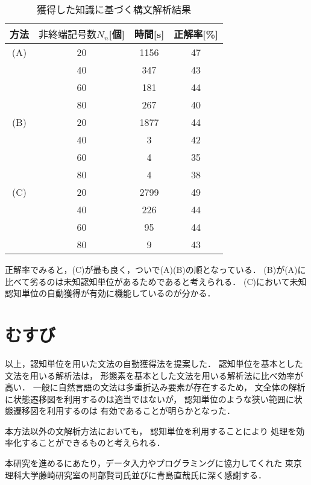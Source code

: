 \begin{table}
\caption{獲得した知識に基づく構文解析結果} \label{hyo4}
\begin{center}
\begin{tabular}{c|c|cc}
\hline \hline
方法 &$非終端記号数N_n$[個] & 時間[s] & 正解率[\%] \\ \hline \hline
(A) & 20 & 1156 & 47 \\
& 40 & 347 & 43 \\
& 60 & 181 & 44 \\
& 80 & 267 & 40 \\ \hline
(B) & 20 & 1877 & 44 \\
& 40 &3 & 42 \\ 
& 60 & 4 & 35 \\
& 80 & 4 & 38 \\ \hline
(C) & 20 & 2799 & 49 \\
& 40 & 226 & 44 \\
& 60 & 95 & 44 \\
& 80 & 9 & 43 \\
\hline \hline
\end{tabular}
\vspace*{-4mm}
\end{center}
\end{table}


正解率でみると，(C)が最も良く，ついで(A)(B)の順となっている．
(B)が(A)に比べて劣るのは未知認知単位があるためであると考えられる．
(C)において未知認知単位の自動獲得が有効に機能しているのが分かる．

\section{むすび}
以上，認知単位を用いた文法の自動獲得法を提案した．
認知単位を基本とした文法を用いる解析法は，
形態素を基本とした文法を用いる解析法に比べ効率が高い．
一般に自然言語の文法は多重折込み要素が存在するため，
文全体の解析に状態遷移図を利用するのは適当ではないが，
認知単位のような狭い範囲に状態遷移図を利用するのは
有効であることが明らかとなった．

本方法以外の文解析方法においても，
認知単位を利用することにより
処理を効率化することができるものと考えられる．


\acknowledgment

本研究を進めるにあたり，データ入力やプログラミングに協力してくれた
東京理科大学藤崎研究室の阿部賢司氏並びに青島直哉氏に深く感謝する．




